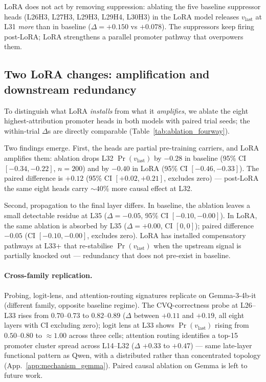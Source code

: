 \documentclass[11pt]{article}
\begin{document}
LoRA does not act by removing suppression: ablating the five
baseline suppressor heads (L26H3, L27H3, L29H3, L29H4, L30H3) in
the LoRA model releases $v_{\text{last}}$ at L31 \emph{more} than
in baseline ($\Delta{=}{+}0.150$ vs $+0.078$). The suppressors
keep firing post-LoRA; LoRA strengthens a parallel promoter
pathway that overpowers them.

\subsection{Two LoRA changes: amplification and downstream
redundancy}
\label{sec:mechanism:causal}

To distinguish what LoRA \emph{installs} from what it
\emph{amplifies}, we ablate the eight highest-attribution promoter
heads in both models with paired trial seeds; the within-trial
$\Delta$s are directly comparable (Table~\ref{tab:ablation_fourway}).

Two findings emerge. First, the heads are partial pre-training
carriers, and LoRA amplifies them: ablation drops L32
$\Pr(v_{\text{last}})$ by $-0.28$ in baseline (95\% CI
$[-0.34, -0.22]$, $n{=}200$) and by $-0.40$ in LoRA (95\% CI
$[-0.46, -0.33]$). The paired difference is $+0.12$ (95\% CI
$[+0.02, +0.21]$, excludes zero) --- post-LoRA the same eight
heads carry $\sim 40\%$ more causal effect at L32.

Second, propagation to the final layer differs. In baseline, the
ablation leaves a small detectable residue at L35
($\Delta {=} {-}0.05$, 95\% CI $[-0.10, -0.00]$). In LoRA, the
same ablation is absorbed by L35 ($\Delta {=} {+}0.00$, CI
$[0, 0]$); paired difference $-0.05$ (CI $[-0.10, -0.00]$,
excludes zero). LoRA has installed compensatory pathways at L33+
that re-stabilise $\Pr(v_{\text{last}})$ when the upstream signal
is partially knocked out --- redundancy that does not pre-exist in
baseline.

\paragraph{Cross-family replication.}
Probing, logit-lens, and attention-routing signatures replicate on
Gemma-3-4b-it (different family, opposite baseline regime). The
CVQ-correctness probe at L26--L33 rises from $0.70$--$0.73$ to
$0.82$--$0.89$ ($\Delta$ between $+0.11$ and $+0.19$, all eight
layers with CI excluding zero); logit lens at L33 shows
$\Pr(v_{\text{last}})$ rising from $0.50$--$0.80$ to $\approx 1.00$
across three cells; attention routing identifies a top-15
promoter cluster spread across L14--L32 ($\Delta$ $+0.33$ to
$+0.47$) --- same late-layer functional pattern as Qwen, with a
distributed rather than concentrated topology
(App.~\ref{app:mechanism_gemma}). Paired causal ablation on Gemma
is left to future work.
\end{document}
